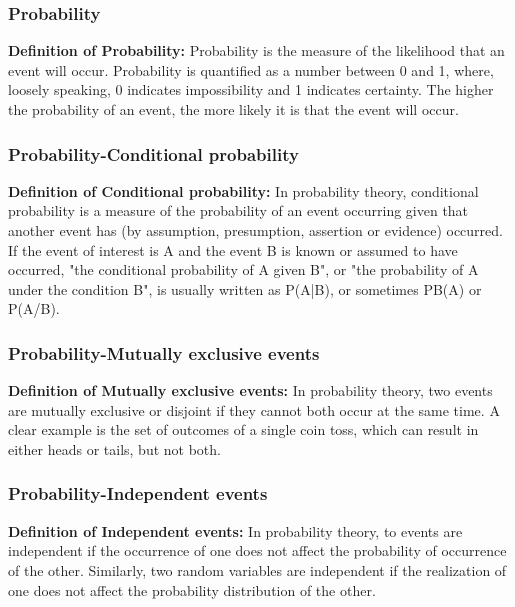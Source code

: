 \documentclass{beamer}
\begin{document}
\begin{frame}
    \frametitle{Probability}
    {\bf Definition of Probability:} Probability is the measure of the likelihood that an event will occur. Probability is quantified as a number between 0 and 1, where, loosely speaking, 0 indicates impossibility and 1 indicates certainty. The higher the probability of an event, the more likely it is that the event will occur.\\
\end{frame}
\begin{frame}
    \frametitle{Probability-Conditional probability}
    {\bf Definition of Conditional probability:} In probability theory, conditional probability is a measure of the probability of an event occurring given that another event has (by assumption, presumption, assertion or evidence) occurred. If the event of interest is A and the event B is known or assumed to have occurred, "the conditional probability of A given B", or "the probability of A under the condition B", is usually written as P(A|B), or sometimes PB(A) or P(A/B).\\
\end{frame}

\begin{frame}
    \frametitle{Probability-Mutually exclusive events}
    {\bf Definition of Mutually exclusive events:} In probability theory, two events are mutually exclusive or disjoint if they cannot both occur at the same time. A clear example is the set of outcomes of a single coin toss, which can result in either heads or tails, but not both.\\
\end{frame}

\begin{frame}
    \frametitle{Probability-Independent events}
    {\bf Definition of Independent events:} In probability theory, to events are independent if the occurrence of one does not affect the probability of occurrence of the other. Similarly, two random variables are independent if the realization of one does not affect the probability distribution of the other.\\
\end{frame}
\end{document}
